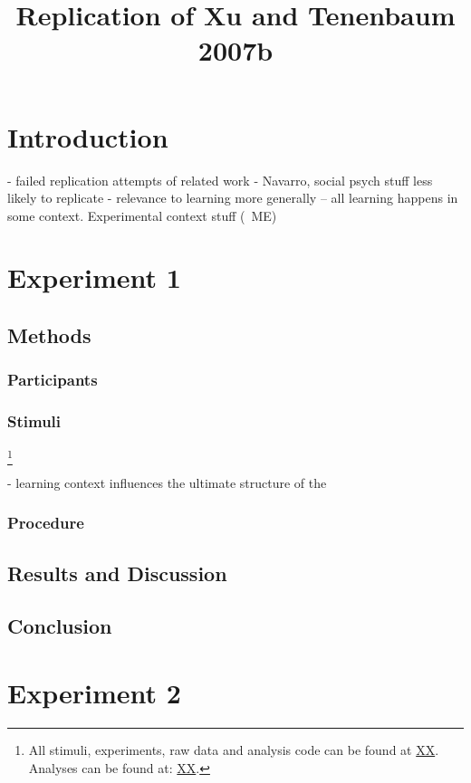 \documentclass[man]{apa2}
\title{Replication of Xu and Tenenbaum 2007b}
\begin{document}
\maketitle              


\section{Introduction}

- failed replication attempts of related work 
- Navarro, social psych stuff less likely to replicate
- relevance to learning more generally -- all learning happens in some context. Experimental context stuff (~ME)

\section{Experiment 1}

\subsection{Methods}

\subsubsection{Participants} 
\subsubsection{Stimuli}
\footnote{All stimuli, experiments, raw data and analysis code can be found at \url{XX}. 
Analyses can be found at: \url{XX}.} 

- learning context influences the ultimate structure of the 

\subsubsection{Procedure}

\subsection{Results and Discussion}

\subsection{Conclusion}

\section{Experiment 2}
\end{document}
